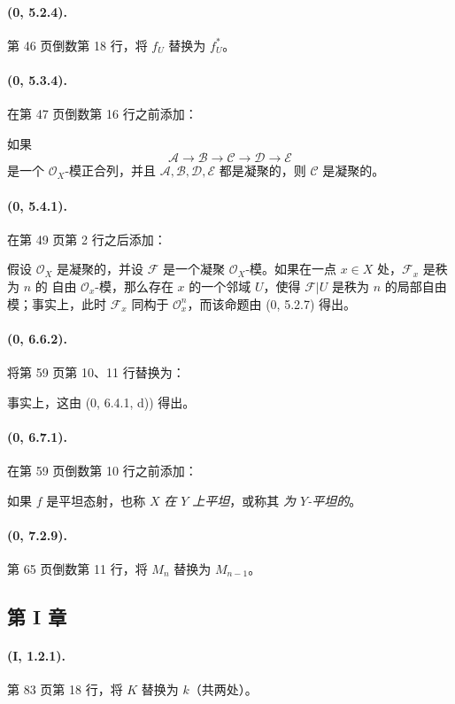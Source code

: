 \documentclass[UTF8,fontset=none,11pt,oneside,openany]{ctexbook}
\providecommand{\sh}{\mathcal}
\begin{document}
\paragraph{(0, 5.2.4).}
第 46 页倒数第 18 行，将 $f_U$ 替换为 $f_U^*$。

\paragraph{(0, 5.3.4).}
在第 47 页倒数第 16 行之前添加：

如果
\[
  \sh{A}\to\sh{B}\to\sh{C}\to\sh{D}\to\sh{E}
\]
是一个 $\sh{O}_X$-模正合列，并且
$\sh{A},\sh{B},\sh{D},\sh{E}$ 都是凝聚的，则 $\sh{C}$ 是凝聚的。

\paragraph{(0, 5.4.1).}
在第 49 页第 2 行之后添加：

假设 $\sh{O}_X$ 是凝聚的，并设 $\sh{F}$ 是一个凝聚
$\sh{O}_X$-模。如果在一点 $x\in X$ 处，$\sh{F}_x$ 是秩为 $n$ 的
自由 $\sh{O}_x$-模，那么存在 $x$ 的一个邻域 $U$，使得
$\sh{F}|U$ 是秩为 $n$ 的局部自由模；事实上，此时 $\sh{F}_x$
同构于 $\sh{O}_x^n$，而该命题由 (0, 5.2.7) 得出。

\paragraph{(0, 6.6.2).}
将第 59 页第 10、11 行替换为：

事实上，这由 (0, 6.4.1, d)) 得出。

\paragraph{(0, 6.7.1).}
在第 59 页倒数第 10 行之前添加：

如果 $f$ 是平坦态射，也称 $X$ \emph{在 $Y$ 上平坦}，或称其
\emph{为 $Y$-平坦的}。

\paragraph{(0, 7.2.9).}
第 65 页倒数第 11 行，将 $M_n$ 替换为 $M_{n-1}$。

\subsection*{第 I 章}

\paragraph{(I, 1.2.1).}
第 83 页第 18 行，将 $K$ 替换为 $k$（共两处）。
\end{document}
